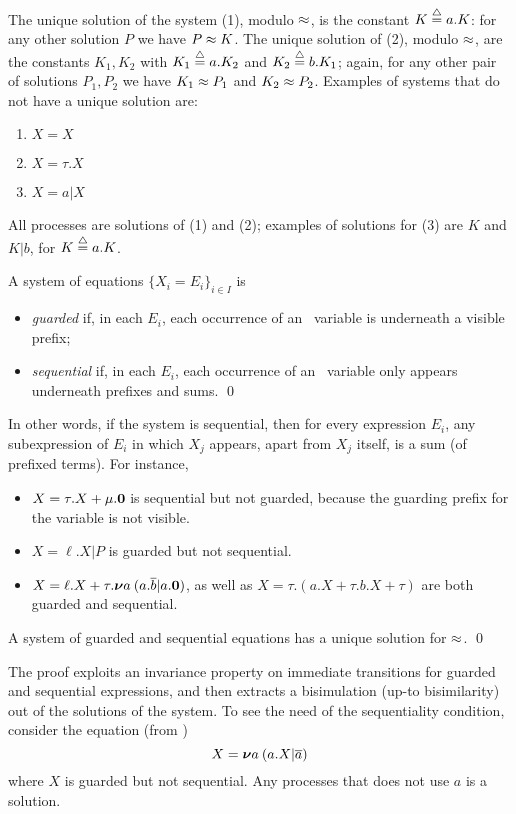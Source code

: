 The unique solution of the system (1), modulo $\approx$,  is the constant $K \stackrel{\mbox{\scriptsize $\triangle$}}{=} a
. K$:  for any other solution $P$ we have $P \approx K$.
The unique solution of (2), modulo $\approx$, are the constants $K_1 , K_2$
with $K_1 \stackrel{\mbox{\scriptsize $\triangle$}}{=} a . K_2$ and $K_2 \stackrel{\mbox{\scriptsize $\triangle$}}{=} b. K_1$; again, for any other
pair of solutions $P_1,P_2$ we have $K_1 \approx P_1$ and $K_2 \approx P_2$.
Examples of systems that do not have a unique solution are: 
\begin{enumerate}
\item $X = X $ 

\item $X = \tau . X$
\item $X = a | X$

\end{enumerate} 
All processes are solutions of (1) and (2); examples of solutions for
(3) are $K$ and $K | b$, for $K \stackrel{\mbox{\scriptsize $\triangle$}}{=} a
. K$.

\begin{definition}
A system of equations 
$\{  X_i = E_i\}_{i\in I}$
 is 
\begin{itemize}
\item
\emph{guarded} if,  in each    $E_i$, each occurrence of
an \behav\  variable is underneath a visible prefix;



\item 
 \emph{sequential} if,  in each    $E_i$, each occurrence of
an \behav\  variable only appears  underneath prefixes and sums.
\qed\end{itemize}
 \end{definition}

In other words,  
if the system is sequential, then 
 for
every expression $E_i$, any subexpression of $E_i$ in which $X_j $ 
appears, apart from $X_j$ itself,  is a sum (of prefixed terms). 
For instance, 
\begin{itemize}
\item $X = \tau. X + \mu . {\boldsymbol 0}$ is sequential but not 
 guarded, because the guarding prefix for the variable
is not visible.

\item $X =  \ell . X | P$ is  guarded but not sequential.

\item $X =  \ell . X + \tau. {\boldsymbol \nu} a\: (a .\overline{b} | a.{\boldsymbol 0})$, as well as 
$X = \tau . (a. X + \tau . b .X + \tau  )$
are both 
 guarded and sequential.
\end{itemize} 


\begin{theorem}
\label{t:Mil89}
A system of guarded and sequential equations
   has 
a unique solution
 for $\approx$. \qed
\end{theorem} 

The proof exploits an invariance property on immediate transitions for
guarded and sequential expressions, and then extracts a bisimulation
(up-to bisimilarity) out
of the solutions of the system.  
To see the  need of the
 sequentiality  condition, 
  consider
 the equation (from \cite{Mil89}) 
\[ X = {\boldsymbol \nu} a\: (a. X | \overline{a}) \]
where $X$ is guarded but not sequential. Any processes that does
not use  $a$
 is a solution.


